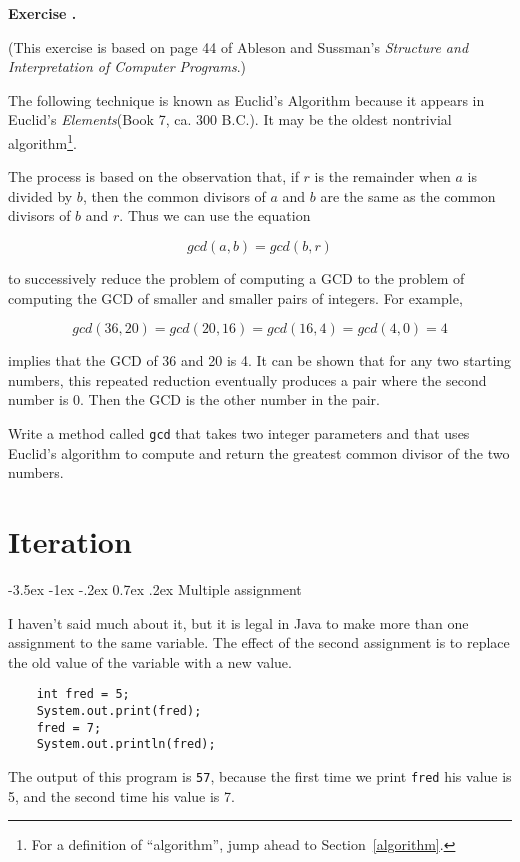 \documentclass{book}
\makeatletter
\newcounter{exercisenum}
\renewcommand{\theexercisenum}{{\thechapter}.\arabic{exercisenum}}
\newenvironment{exercisesize}{\begin{small}}{\end{small}}
\newcommand{\exerciseheader}[2]{                                          
     
  \begin{exercisesize}                                                    
     
     
  \def\theenumi{\alph{enumi}}                                             
  \def\labelenumi{\theenumi.}                                             
  \def\theenumii{\roman{enumii}}                                          
  \def\labelenumii{\theenumii.}                                           
  {\bf Exercise {#1}{#2}}\hspace{0.1in}                 
}
\newcommand{\startexercise}[1]{%
  \refstepcounter{exercisenum}                                            
  \exerciseheader{\theexercisenum}{#1}                                    
}
\newcommand{\stopexercise}{%
  {\hfill}                                                               
  \end{exercisesize}      
}
\newcommand{\normaldif}{}
\newenvironment{exercise}{\startexercise{\normaldif{}}}{\stopexercise}
\renewcommand{\section}{\@startsection 
    {section} {1} {0mm}%
    {-3.5ex \@plus -1ex \@minus -.2ex}%
    {0.7ex \@plus.2ex}%
    {\normalfont\Large\bfseries}}
\newcommand{\clearemptydoublepage}{\newpage{\pagestyle{empty}\cleardoublepage}}
\newcommand{\beforechapter}{
    \cleardoublepage 
    \setcounter{exercisenum}{0}
}
\makeatother
\begin{document}
\begin{exercise}
\label{gcd}
(This exercise is based on page 44 of Ableson and Sussman's
{\em Structure and Interpretation of Computer Programs}.)

The following technique is known as Euclid's Algorithm because
it appears in Euclid's {\em Elements}(Book 7, ca. 300 B.C.).
It may be the oldest nontrivial algorithm\footnote{For a definition
of ``algorithm'', jump ahead to Section~\ref{algorithm}.}.

The process is based on the observation that, if $r$ is the
remainder when $a$ is divided by $b$, then the common divisors
of $a$ and $b$ are the same as the common divisors of $b$ and $r$.
Thus we can use the equation

\[ gcd(a, b) = gcd(b, r) \]

to successively reduce the problem of computing a GCD to the
problem of computing the GCD of smaller and smaller pairs of integers.
For example,

\[ gcd(36, 20) = gcd(20, 16) = gcd(16, 4) = gcd(4, 0) = 4\]

implies that the GCD of 36 and 20 is 4.  It can be shown
that for any two starting numbers, this repeated reduction eventually
produces a pair where the second number is 0.  Then the GCD is the
other number in the pair.

Write a method called {\tt gcd} that takes two integer parameters and
that uses Euclid's algorithm to compute and return the greatest
common divisor of the two numbers.
\end{exercise}


\beforechapter
\chapter{Iteration}
\label{chap06}

\section{Multiple assignment}

I haven't said much about it, but it is legal in Java to
make more than one assignment to the same variable.  The
effect of the second assignment is to replace the old value
of the variable with a new value.

\begin{verbatim}
    int fred = 5;
    System.out.print(fred);
    fred = 7;
    System.out.println(fred);
\end{verbatim}
%
The output of this program is {\tt 57}, because the first
time we print {\tt fred} his value is 5, and the second time
his value is 7.
\end{document}
